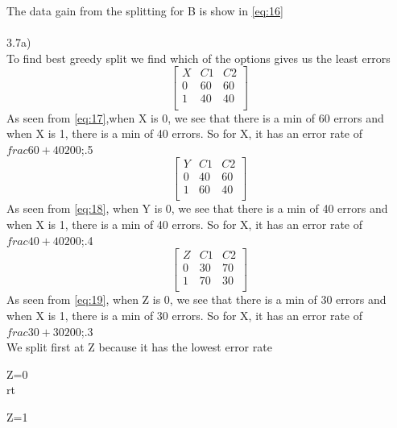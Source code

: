 \documentclass[12pt,english]{article}
\begin{document}
The data gain from the splitting for B is show in \eqref{eq:16}\\ \\
3.7a)\\
To find best greedy split we find which of the options gives us the least errors
\begin{equation*}\tag{1}\label{eq:17}
\begin{bmatrix} X & C1 & C2 \\0 & 60 &  60 \\1 & 40 &  40 \\ \end{bmatrix}
\end{equation*}
As seen from \eqref{eq:17},when X is 0, we see that there is a min of 60 errors and when X is 1, there is a min of 40 errors. So for X, it has an error rate of $frac{60+40}{200}$;.5\\
\begin{equation*}\tag{2}\label{eq:18}
\begin{bmatrix} Y & C1 & C2 \\0 & 40 &  60 \\1 & 60 &  40 \\ \end{bmatrix}
\end{equation*}
As seen from \eqref{eq:18}, when Y is 0, we see that there is a min of 40 errors and when X is 1, there is a min of 40 errors. So for X, it has an error rate of $frac{40+40}{200}$;.4\\
\begin{equation*}\tag{3}\label{eq:19}
\begin{bmatrix} Z & C1 & C2 \\0 & 30 &  70 \\1 & 70 &  30 \\ \end{bmatrix}
\end{equation*}
As seen from \eqref{eq:19}, when Z is 0, we see that there is a min of 30 errors and when X is 1, there is a min of 30 errors. So for X, it has an error rate of $frac{30+30}{200}$;.3\\
We split first at Z because it has the lowest error rate\par
Z=0\\

rt\par
Z=1\\
\end{document}
